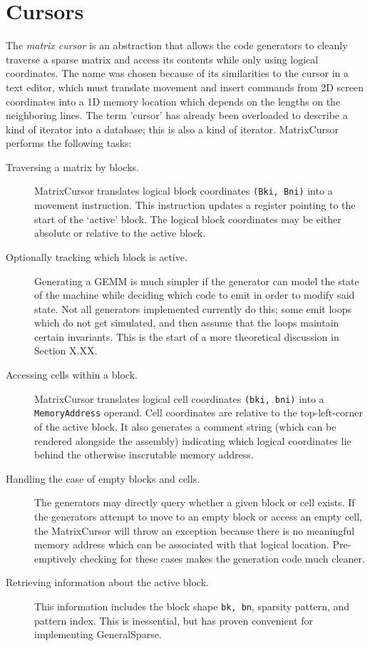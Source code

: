\section{Cursors}


    The \emph{matrix cursor} is an abstraction that allows the code generators to cleanly traverse a sparse matrix and access its contents while only using logical coordinates. The name was chosen because of its similarities to the cursor in a text editor, which must translate movement and insert commands from 2D screen coordinates into a 1D memory location which depends on the lengths on the neighboring lines. The term 'cursor' has already been overloaded to describe a kind of iterator into a database; this is also a kind of iterator. MatrixCursor performs the following tasks:

    \begin{description}

    \item[Traversing a matrix by blocks.] MatrixCursor translates logical block coordinates \texttt{(Bki, Bni)} into a movement instruction. This instruction updates a register pointing to the start of the `active' block. The logical block coordinates may be either absolute or relative to the active block.

    \item[Optionally tracking which block is active.] Generating a GEMM is much simpler if the generator can model the state of the machine while deciding which code to emit in order to modify said state. Not all generators implemented currently do this; some emit loops which do not get simulated, and then assume that the loops maintain certain invariants. This is the start of a more theoretical discussion in Section X.XX. 

    \item[Accessing cells within a block.] MatrixCursor translates logical cell coordinates \texttt{(bki, bni)} into a \texttt{MemoryAddress} operand. Cell coordinates are relative to the top-left-corner of the active block. It also generates a comment string (which can be rendered alongside the assembly) indicating which logical coordinates lie behind the otherwise inscrutable memory address.

    \item[Handling the case of empty blocks and cells.] The generators may directly query whether a given block or cell exists. If the generators attempt to move to an empty block or access an empty cell, the MatrixCursor will throw an exception because there is no meaningful memory address which can be associated with that logical location. Pre-emptively checking for these cases makes the generation code much cleaner.

    \item[Retrieving information about the active block.] This information includes the block shape \texttt{bk, bn}, sparsity pattern, and pattern index. This is inessential, but has proven convenient for implementing GeneralSparse.

    \end{description}



